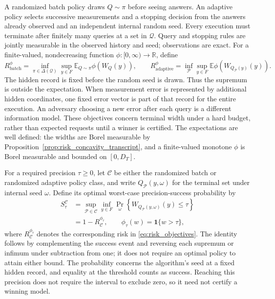 \documentclass[12pt]{article}
\begin{document}
A randomized batch policy draws $Q\sim\pi$ before seeing answers. An
adaptive policy selects successive measurements and a stopping decision
from the answers already observed and an independent internal random
seed. Every execution must terminate after finitely many queries at a
set in $\mathcal Q$. Query and stopping rules are jointly measurable in
the observed history and seed; observations are exact. For a finite-valued,
nondecreasing function $\phi:[0,\infty)\to\mathbb R$, define
\begin{equation}
 R_{\mathrm{batch}}^{\phi}
 =\inf_{\pi\in\Delta(\mathcal Q)}\sup_{y\in F}
   \mathbb E_{Q\sim\pi}\phi(W_Q(y)),\qquad
 R_{\mathrm{adaptive}}^{\phi}
 =\inf_{\mathcal P}\sup_{y\in F}
   \mathbb E\phi(W_{Q_{\mathcal P}(y)}(y)).
 \label{eq:risk_objectives}
\end{equation}
The hidden record is fixed before the random seed is drawn. Thus the
supremum is outside the expectation. When measurement error is represented
by additional hidden coordinates, one fixed error vector is part of that
record for the entire execution. An adversary choosing a new error after
each query is a different information model. These objectives concern terminal
width under a hard budget, rather than expected requests until a winner
is certified. The expectations are well defined: the widths are Borel
measurable by Proposition~\ref{prop:risk_concavity_transcript}, and a
finite-valued monotone $\phi$ is Borel measurable and bounded on $[0,D_T]$.

For a required precision $\tau\geq0$, let $\mathcal C$ be either the
randomized batch or randomized adaptive policy class, and write
$Q_{\mathcal P}(y,\omega)$ for the terminal set under internal seed
$\omega$. Define its optimal worst-case precision-success probability by
\begin{equation}
\begin{aligned}
 S_\tau^{\mathcal C}
 &=\sup_{\mathcal P\in\mathcal C}\inf_{y\in F}
   \Pr_\omega\!\left\{W_{Q_{\mathcal P}(y,\omega)}(y)\leq\tau\right\}\\
 &=1-R_{\mathcal C}^{\phi_\tau},\qquad
   \phi_\tau(w)=\boldsymbol{1}\{w>\tau\},
\end{aligned}
\label{eq:risk_precision_success}
\end{equation}
where $R_{\mathcal C}^{\phi_\tau}$ denotes the corresponding risk in
\eqref{eq:risk_objectives}. The identity follows by complementing the
success event and reversing each supremum or infimum under subtraction
from one; it does not require an optimal policy to attain either bound.
The probability concerns the algorithm's seed at a fixed hidden record,
and equality at the threshold counts as success. Reaching this precision
does not require the interval to exclude zero, so it need not certify a
winning model.
\end{document}
